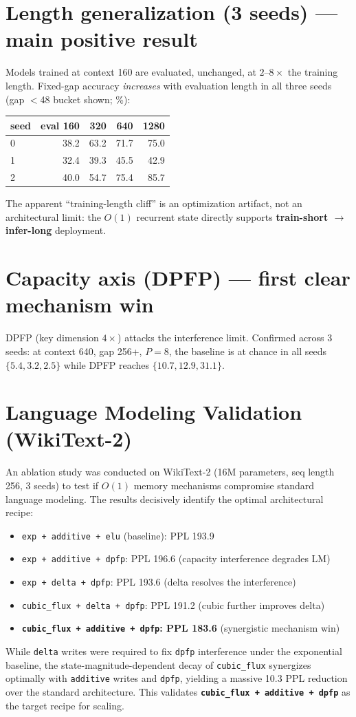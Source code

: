 \documentclass[11pt,a4paper]{article}
\newcommand{\code}[1]{\texttt{#1}}
\begin{document}
\section{Length generalization (3 seeds) --- main positive result}
Models trained at context 160 are evaluated, unchanged, at $2$--$8\times$ the training length. Fixed-gap accuracy \emph{increases} with evaluation length in all three seeds (gap $<$48 bucket shown; \%):

\begin{table}[h]\centering
\begin{tabular}{lrrrr}
\toprule
seed & eval 160 & 320 & 640 & 1280 \\
\midrule
0 & 38.2 & 63.2 & 71.7 & 75.0 \\
1 & 32.4 & 39.3 & 45.5 & 42.9 \\
2 & 40.0 & 54.7 & 75.4 & 85.7 \\
\bottomrule
\end{tabular}
\end{table}

\noindent
The apparent ``training-length cliff'' is an optimization artifact, not an architectural limit: the $O(1)$ recurrent state directly supports \textbf{train-short $\rightarrow$ infer-long} deployment.

\section{Capacity axis (DPFP) --- first clear mechanism win}
DPFP (key dimension $4\times$) attacks the interference limit. Confirmed across 3 seeds: at context 640, gap 256+, $P{=}8$, the baseline is at chance in all seeds $\{5.4, 3.2, 2.5\}$ while DPFP reaches $\{10.7, 12.9, 31.1\}$.

\section{Language Modeling Validation (WikiText-2)}
An ablation study was conducted on WikiText-2 (16M parameters, seq length 256, 3 seeds) to test if $O(1)$ memory mechanisms compromise standard language modeling. The results decisively identify the optimal architectural recipe:
\begin{itemize}
\item \code{exp + additive + elu} (baseline): PPL 193.9
\item \code{exp + additive + dpfp}: PPL 196.6 (capacity interference degrades LM)
\item \code{exp + delta + dpfp}: PPL 193.6 (delta resolves the interference)
\item \code{cubic\_flux + delta + dpfp}: PPL 191.2 (cubic further improves delta)
\item \textbf{\code{cubic\_flux + additive + dpfp}: PPL 183.6} (synergistic mechanism win)
\end{itemize}
While \code{delta} writes were required to fix \code{dpfp} interference under the exponential baseline, the state-magnitude-dependent decay of \code{cubic\_flux} synergizes optimally with \code{additive} writes and \code{dpfp}, yielding a massive 10.3 PPL reduction over the standard architecture. This validates \textbf{\code{cubic\_flux + additive + dpfp}} as the target recipe for scaling.
\end{document}
